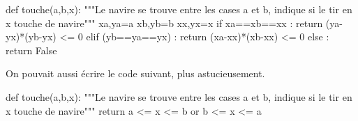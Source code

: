 \question{}
\begin{pyverbatim}
def touche(a,b,x):
    """Le navire se trouve entre les cases a et b, indique si le tir
    en x touche de navire"""
    xa,ya=a
    xb,yb=b
    xx,yx=x
    if xa==xb==xx :
        return (ya-yx)*(yb-yx) <= 0
    elif (yb==ya==yx) :
        return (xa-xx)*(xb-xx) <= 0
    else :
        return False 
\end{pyverbatim}
On pouvait aussi écrire le code suivant, plus astucieusement.
\begin{pyverbatim}
def touche(a,b,x):
    """Le navire se trouve entre les cases a et b, indique si le tir
    en x touche de navire"""
    return a <= x <= b or b <= x <= a
\end{pyverbatim}